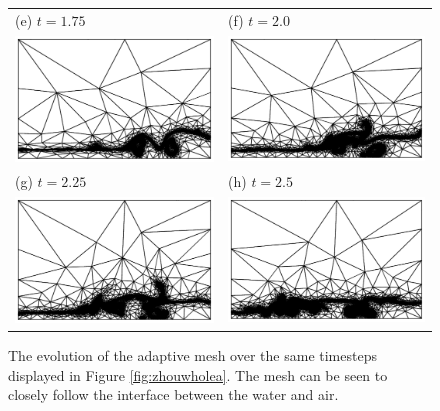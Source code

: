\begin{figure}[tbp]
\begin{center}
\begin{tabular}{ll}
(e) $t = 1.75$ & (f) $t = 2.0$ \\
\includegraphics[width=7cm, clip=true]{examples_images/water_collapse/water_collapse_350_mesh.pdf} & \includegraphics[width=7cm, clip=true]{examples_images/water_collapse/water_collapse_400_mesh.pdf} \\
(g) $t = 2.25$ & (h) $t = 2.5$ \\
\includegraphics[width=7cm, clip=true]{examples_images/water_collapse/water_collapse_450_mesh.pdf} & \includegraphics[width=7cm, clip=true]{examples_images/water_collapse/water_collapse_500_mesh.pdf} \\
\end{tabular}
\caption{The evolution of the adaptive mesh over the same timesteps displayed in Figure \ref{fig:zhouwholea}.  The mesh can be seen to closely follow the interface between the water and air.}
\label{fig:zhouwholemesh}
\end{center}
\end{figure}

